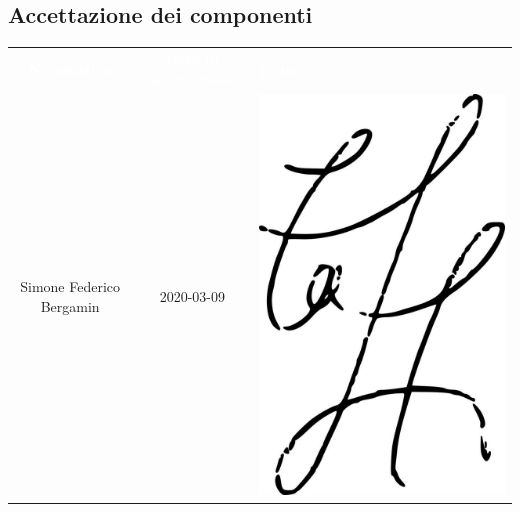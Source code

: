 \subsection{Accettazione dei componenti}
\begin{table}[H]	
	\begin{center}
	\begin{tabular}{ c c C{6cm}}
		\textcolor{white}{\textbf{Nominativo}} & \textcolor{white}{\textbf{Data di accettazione}} & \textcolor{white}{\textbf{Firma}} \\
		Simone Federico Bergamin & 2020-03-09 & \includegraphics[scale=0.2]{img/firme/bergamin.png}\\

\end{tabular}
\end{center}
\end{table}
